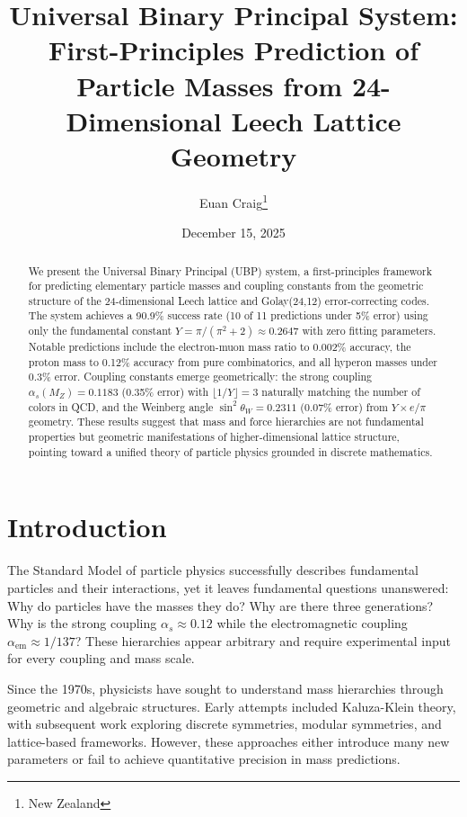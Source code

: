 \documentclass[11pt,twocolumn]{article}
\title{Universal Binary Principal System: First-Principles Prediction of Particle Masses from 24-Dimensional Leech Lattice Geometry}
\author{Euan Craig\thanks{New Zealand}}
\date{December 15, 2025}
\begin{document}
\onecolumn

\maketitle

\begin{abstract}
We present the Universal Binary Principal (UBP) system, a first-principles framework for predicting elementary particle masses and coupling constants from the geometric structure of the 24-dimensional Leech lattice and Golay(24,12) error-correcting codes. The system achieves a 90.9\% success rate (10 of 11 predictions under 5\% error) using only the fundamental constant $Y = \pi/(\pi^2 + 2) \approx 0.2647$ with zero fitting parameters. Notable predictions include the electron-muon mass ratio to 0.002\% accuracy, the proton mass to 0.12\% accuracy from pure combinatorics, and all hyperon masses under 0.3\% error. Coupling constants emerge geometrically: the strong coupling $\alpha_s(M_Z) = 0.1183$ (0.35\% error) with $\lfloor 1/Y \rfloor = 3$ naturally matching the number of colors in QCD, and the Weinberg angle $\sin^2\theta_W = 0.2311$ (0.07\% error) from $Y \times e/\pi$ geometry. These results suggest that mass and force hierarchies are not fundamental properties but geometric manifestations of higher-dimensional lattice structure, pointing toward a unified theory of particle physics grounded in discrete mathematics.
\end{abstract}

\section{Introduction}

The Standard Model of particle physics successfully describes fundamental particles and their interactions, yet it leaves fundamental questions unanswered: Why do particles have the masses they do? Why are there three generations? Why is the strong coupling $\alpha_s \approx 0.12$ while the electromagnetic coupling $\alpha_{\text{em}} \approx 1/137$? These hierarchies appear arbitrary and require experimental input for every coupling and mass scale.

Since the 1970s, physicists have sought to understand mass hierarchies through geometric and algebraic structures. Early attempts included Kaluza-Klein theory, with subsequent work exploring discrete symmetries, modular symmetries, and lattice-based frameworks. However, these approaches either introduce many new parameters or fail to achieve quantitative precision in mass predictions.
\end{document}
